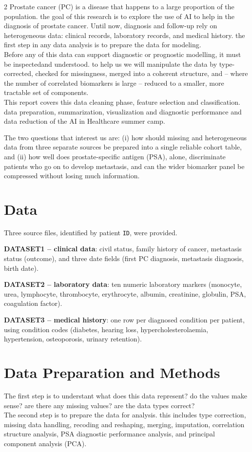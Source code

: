 ﻿\documentclass[a4paper,10pt]{article}
\begin{document}
\begin{multicols*}{2}
Prostate cancer (PC) is a disease that happens to a large proportion of the population. the goal of this research is to explore the use of AI to help in the diagnosis of prostate cancer. 
Until now, diagnosis and follow-up rely on heterogeneous data: clinical records, laboratory records, and medical history. the first step in any data analysis is to prepare the data for modeling.\\
Before any of this data can support diagnostic or prognostic modelling, it must be inspectedand understood. to help us we will manipulate the data by type-corrected, checked for missingness, merged into a coherent structure, and -- where the number of correlated biomarkers is large -- reduced to a smaller, more tractable set of components.\\
This report covers this data cleaning phase, feature selection and classification. data preparation, summarization, visualization and diagnostic performance and data reduction of the AI in Healthcare summer camp.

The two questions that interest us are: (i) how should missing and heterogeneous data from three separate sources be prepared into a single reliable cohort table, and (ii) how well does prostate-specific antigen (PSA), alone, discriminate patients who go on to develop metastasis, and can the wider biomarker panel be compressed without losing much information.

\section{Data}

Three source files, identified by patient \texttt{ID}, were provided.

\textbf{DATASET1 -- clinical data}: civil status, family history of cancer, metastasis status (outcome), and three date fields (first PC diagnosis, metastasis diagnosis, birth date).

\textbf{DATASET2 -- laboratory data}: ten numeric laboratory markers (monocyte, urea, lymphocyte, thrombocyte, erythrocyte, albumin, creatinine, globulin, PSA, coagulation factor).

\textbf{DATASET3 -- medical history}: one row per diagnosed condition per patient, using condition codes (diabetes, hearing loss, hypercholesterolaemia, hypertension, osteoporosis, urinary retention).

\section{Data Preparation and Methods}
The first step is to understant what does this data represent? do the values make sense? are there any missing values? are the data types correct?\\
The second step is to prepare the data for analysis. this includes type correction, missing data handling, recoding and reshaping, merging, imputation, correlation structure analysis, PSA diagnostic performance analysis, and principal component analysis (PCA).


\end{multicols*}
\end{document}
